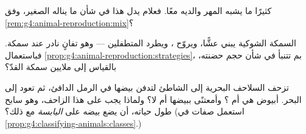 \begin{exercise}[$\star\star$]\label{exo:g4:animal-reproduction:9}
كثيرًا ما يشبه المهر والديه معًا. فعلام يدل هذا في شأن ما يناله
الصغير، وفق \cref{rem:g4:animal-reproduction:mix}؟
\end{exercise}

\begin{exercise}[$\star\star$]\label{exo:g4:animal-reproduction:10}
 السمكة الشوكية يبني عشًّا، ويروّح ، ويطرد المتطفلين ---
وهو تفانٍ نادر عند سمكة. فباستعمال
\cref{prop:g4:animal-reproduction:strategies}، بم تتنبأ في شأن
حجم حضنته، بالقياس إلى ملايين سمكة القدّ؟
\end{exercise}

\begin{exercise}[$\star\star\star$]\label{exo:g4:animal-reproduction:11}
تزحف السلاحف البحرية إلى الشاطئ لتدفن بيضها في الرمل الدافئ، ثم
تعود إلى البحر. أبيوض هي أم ؟ وأمعتنًى ببيضها أم لا؟ ولماذا
يجب على هذا الزاحف، وهو سابح طول حياته، أن يضع بيضه على
\emph{اليابسة} مع ذلك؟ (استعمل صفات  في
\cref{prop:g4:classifying-animals:classes}.)
\end{exercise}
